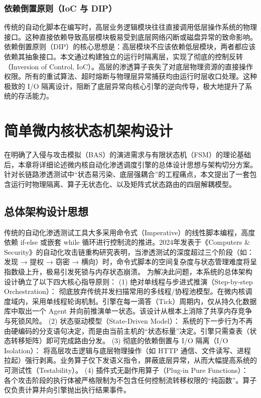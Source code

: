 \documentclass[twoside,openright]{xduugthesis}
\begin{document}
\subsection{依赖倒置原则（IoC 与 DIP）}
传统的自动化脚本在编写时，高层业务逻辑模块往往直接调用低层操作系统的物理接口。这种直接依赖导致高层模块极易受到底层网络闪断或磁盘异常的致命影响。
依赖倒置原则（DIP）的核心思想是：高层模块不应该依赖低层模块，两者都应该依赖其抽象接口\cite{martin2017clean}。本文通过构建独立的运行时隔离层，实现了彻底的控制反转（Inversion of Control, IoC）。高层的渗透算子丧失了对底层物理资源的直接操作权限。所有的重试算法、超时熔断与物理层异常捕获均由运行时层收口处理。这种极致的 I/O 隔离设计，阻断了底层异常向核心引擎的逆向传导，极大地提升了系统的存活能力。

\chapter{简单微内核状态机架构设计}

在明确了入侵与攻击模拟（BAS）的演进需求与有限状态机（FSM）的理论基础后，本章将详细论述微内核自动化渗透调度引擎的总体设计思想与架构切分方案。针对长链路渗透测试中“状态易污染、底层强耦合”的工程痛点，本文提出了一套包含运行时物理隔离、算子无状态化、以及矩阵式状态路由的四层解耦模型。

\section{总体架构设计思想}

传统的自动化渗透测试工具大多采用命令式（Imperative）的线性脚本编程，高度依赖 if-else 或嵌套 while 循环进行控制流的推进。2024年发表于《Computers \& Security》的自动化攻击链重构研究表明，当渗透测试的深度超过三个阶段（如：发现 → 提权 → 窃密 → 横向）时，命令式脚本的空间复杂度与状态管理难度将呈指数级上升，极易引发死锁与内存状态崩溃\cite{li2024statedriven}。
为解决此问题，本系统的总体架构设计确立了以下四大核心指导原则：
(1) 绝对单线程与步进式推演（Step-by-step Orchestration）： 彻底放弃传统并发扫描常用的多线程/协程池模型。在微内核调度域内，采用单线程轮询机制。引擎在每一滴答（Tick）周期内，仅从持久化数据库中取出一个 Agent 并向前推演单一状态。该设计从根本上消除了共享内存竞争与死锁风险。
(2) 状态驱动模型（State-Driven Model）： 系统的下一步行为不再由硬编码的分支语句决定，而是由当前主机的“状态标量”决定。引擎只需查表（状态转移矩阵）即可完成路由分发。
(3) 彻底的依赖倒置与 I/O 隔离（I/O Isolation）： 将高层攻击逻辑与底层物理操作（如 HTTP 通信、文件读写、进程拉起）强行剥离。业务算子仅下发语义指令，屏蔽底层异常，从而大幅提高系统的可测试性（Testability）。
(4) 插件式无副作用算子（Plug-in Pure Functions）： 各个攻击阶段的执行体被严格限制为不包含任何控制流转移权限的“纯函数”。算子仅负责计算并向引擎抛出执行结果事件。
\end{document}
